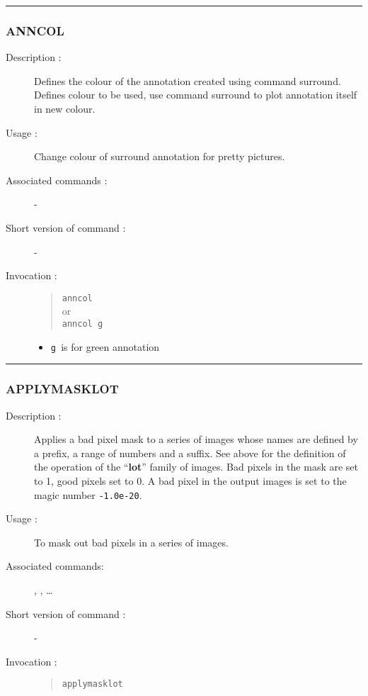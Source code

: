 \hrule 
\subsubsection*{\label{ANNCOL}ANNCOL}

\begin{description}

\item[Description :] Defines the colour of the annotation created using
command surround.  Defines colour to be used, use command surround to plot
annotation itself in new colour. 

\item[Usage :] Change colour of surround annotation for pretty pictures.
\item[Associated commands :] -
\item[Short version of command :] -
\item[Invocation :]

\begin{quote}{\tt anncol }\\
or \\
{\tt anncol g }
\end{quote}

\begin{itemize}

\item {\tt g }\/is for green annotation

\end{itemize}

\end{description}

\hrule 
\subsubsection*{\label{APPLYMASKLOT}APPLYMASKLOT}

\begin{description}

\item[Description :] Applies a bad pixel mask to a series of images whose
names are defined by a prefix, a range of numbers and a suffix.  See above
for the definition of the operation of the ``{\bf lot}'' family of images. Bad
pixels in the mask are set to 1, good pixels set to 0.  A bad pixel in the
output images is set to the magic number {\tt -1.0e-20}. 

\item[Usage :] To mask out bad pixels in a series of images.
\item[Associated commands:] {\tt {}}, 
{\tt {}}, \ldots
\item[Short version of command :] -
\item[Invocation :]

\begin{quote}{\tt  applymasklot }\end{quote}

\end{description}

